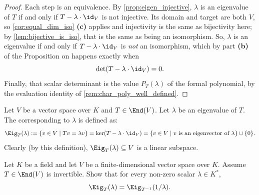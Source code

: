 \begin{proof}
Each step is an equivalence. By \cref{prop:eigen_injective}, $\lambda$ is an eigenvalue of $T$ if and only if $T - \lambda \cdot \id_V$ is not injective. Its domain and target are both $V$, so \cref{cor:equal_dim_iso} \textbf{(c)} applies and injectivity is the same as bijectivity here; by \cref{lem:bijective_is_iso}, that is the same as being an isomorphism. So, $\lambda$ is an eigenvalue if and only if $T - \lambda \cdot \id_V$ is \emph{not} an isomorphism, which by part \textbf{(b)} of the Proposition on  happens exactly when
\[
\det(T - \lambda \cdot \id_V) = 0.
\]
Finally, that scalar determinant is the value $P_T(\lambda)$ of the formal polynomial, by the evaluation identity of \cref{rem:char_poly_well_defined}.
\end{proof}

\begin{definition}[Eigenspace]\label{def:eigenspace}
  Let $V$ be a vector space over $K$ and $T \in \End(V)$. Let $\lambda$ be an eigenvalue of $T$. The  corresponding to $\lambda$ is defined as:
  \[ \Eig_T(\lambda) := \{v \in V \mid Tv = \lambda v\} = \ker(T - \lambda \cdot \id_V) = \{v \in V \mid v \text{ is an eigenvector of } \lambda\} \cup \{0\}. \]
  Clearly (by this definition), $\Eig_T(\lambda) \subseteq V$ is a linear subspace.
\end{definition}

\begin{exercise}
  \label{exc:eigenspaces_inverse_endomorphism}
  Let $K$ be a field and let $V$ be a finite-di\-men\-sional vector space over $K$. Assume $T \in \End(V)$ is invertible. Show that for every non-zero scalar $\lambda \in K^*$,
  \[
  \Eig_T(\lambda) = \Eig_{T^{-1}}(1/\lambda).
  \]
\end{exercise}


